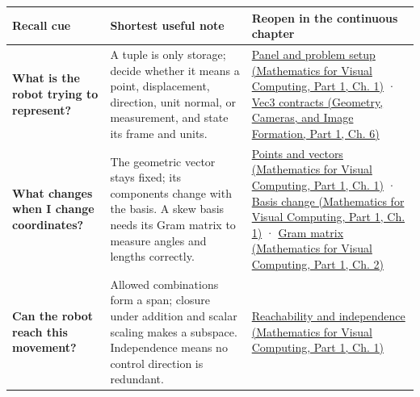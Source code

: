 {\def\LTcaptype{none} %
\begin{longtable}[]{@{}
  >{\raggedright\arraybackslash}p{}
  >{\raggedright\arraybackslash}p{}
  >{\raggedright\arraybackslash}p{}@{}}
\toprule\noalign{}
\begin{minipage}[b]{\linewidth}\raggedright
Recall cue
\end{minipage} & \begin{minipage}[b]{\linewidth}\raggedright
Shortest useful note
\end{minipage} & \begin{minipage}[b]{\linewidth}\raggedright
Reopen in the continuous chapter
\end{minipage} \\
\midrule\noalign{}
\endhead
\bottomrule\noalign{}
\endlastfoot
\textbf{What is the robot trying to represent?} & A tuple is only storage; decide whether it means a point, displacement, direction, unit normal, or measurement, and state its frame and units. & \href{../02-Mathematics-for-Visual-Computing-P01/main.pdf\#01-foundations-i-ch017-the-panel-gives-us-a-reason-to-learn}{Panel and problem setup (Mathematics for Visual Computing, Part 1, Ch. 1)} · \href{../03-Geometry-Cameras-and-Image-Formation-P01/main.pdf\#02-foundations-ii-ch037-three-stored-numbers-are-not-the-complete-contract}{Vec3 contracts (Geometry, Cameras, and Image Formation, Part 1, Ch. 6)} \\
\textbf{What changes when I change coordinates?} & The geometric vector stays fixed; its components change with the basis. A skew basis needs its Gram matrix to measure angles and lengths correctly. & \href{../02-Mathematics-for-Visual-Computing-P01/main.pdf\#01-foundations-i-ch017-an-arrow-is-not-the-address-written-beside-it}{Points and vectors (Mathematics for Visual Computing, Part 1, Ch. 1)} · \href{../02-Mathematics-for-Visual-Computing-P01/main.pdf\#01-foundations-i-ch017-a-basis-is-a-measuring-arrangement-not-the-vector-itself}{Basis change (Mathematics for Visual Computing, Part 1, Ch. 1)} · \href{../02-Mathematics-for-Visual-Computing-P01/main.pdf\#01-foundations-i-ch018-a-gram-matrix-remembers-the-geometry-of-a-slanted-basis}{Gram matrix (Mathematics for Visual Computing, Part 1, Ch. 2)} \\
\textbf{Can the robot reach this movement?} & Allowed combinations form a span; closure under addition and scalar scaling makes a subspace. Independence means no control direction is redundant. & \href{../02-Mathematics-for-Visual-Computing-P01/main.pdf\#01-foundations-i-ch017-the-reachable-movements-form-a-vector-space}{Reachability and independence (Mathematics for Visual Computing, Part 1, Ch. 1)} \\

\end{longtable}}
